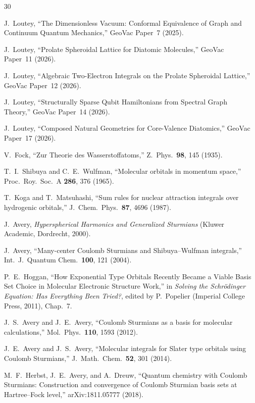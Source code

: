 \documentclass[aps,pra,twocolumn,superscriptaddress,longbibliography]{revtex4-2}
\begin{document}
\begin{thebibliography}{30}

J.~Loutey, ``The Dimensionless Vacuum: Conformal Equivalence of
  Graph and Continuum Quantum Mechanics,'' GeoVac Paper~7 (2025).

J.~Loutey, ``Prolate Spheroidal Lattice for Diatomic Molecules,''
  GeoVac Paper~11 (2026).

J.~Loutey, ``Algebraic Two-Electron Integrals on the Prolate
  Spheroidal Lattice,'' GeoVac Paper~12 (2026).

J.~Loutey, ``Structurally Sparse Qubit Hamiltonians from Spectral
  Graph Theory,'' GeoVac Paper~14 (2026).

J.~Loutey, ``Composed Natural Geometries for Core-Valence Diatomics,''
  GeoVac Paper~17 (2026).

V.~Fock, ``Zur Theorie des Wasserstoffatoms,''
  Z.~Phys.\ \textbf{98}, 145 (1935).

T.~I.~Shibuya and C.~E.~Wulfman, ``Molecular orbitals in momentum
  space,'' Proc.\ Roy.\ Soc.\ A \textbf{286}, 376 (1965).

T.~Koga and T.~Matsuhashi, ``Sum rules for nuclear attraction
  integrals over hydrogenic orbitals,''
  J.~Chem.\ Phys.\ \textbf{87}, 4696 (1987).

J.~Avery, \emph{Hyperspherical Harmonics and Generalized Sturmians}
  (Kluwer Academic, Dordrecht, 2000).

J.~Avery, ``Many-center Coulomb Sturmians and Shibuya--Wulfman
  integrals,'' Int.\ J.\ Quantum Chem.\ \textbf{100}, 121 (2004).

P.~E.~Hoggan, ``How Exponential Type Orbitals Recently Became a Viable
  Basis Set Choice in Molecular Electronic Structure Work,'' in
  \emph{Solving the Schr\"odinger Equation: Has Everything Been
  Tried?}, edited by P.~Popelier (Imperial College Press, 2011),
  Chap.~7.

J.~S.~Avery and J.~E.~Avery, ``Coulomb Sturmians as a basis for
  molecular calculations,'' Mol.\ Phys.\ \textbf{110}, 1593 (2012).

J.~E.~Avery and J.~S.~Avery, ``Molecular integrals for Slater type
  orbitals using Coulomb Sturmians,''
  J.~Math.\ Chem.\ \textbf{52}, 301 (2014).

M.~F.~Herbst, J.~E.~Avery, and A.~Dreuw, ``Quantum chemistry with
  Coulomb Sturmians: Construction and convergence of Coulomb Sturmian
  basis sets at Hartree--Fock level,'' arXiv:1811.05777 (2018).

\end{thebibliography}
\end{document}
